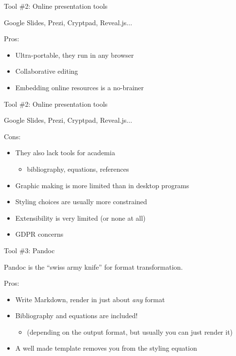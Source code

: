 \documentclass[aspectratio=169]{fireshonks}
\begin{document}
\begin{frame}{Tool \#2: Online presentation tools}
  \begin{center}
    Google Slides, Prezi, Cryptpad, Reveal.js...
  \end{center}

  Pros:
  \begin{itemize}
    \item Ultra-portable, they run in any browser
    \item Collaborative editing
    \item Embedding online resources is a no-brainer
  \end{itemize}
\end{frame}
\begin{frame}{Tool \#2: Online presentation tools}
  \begin{center}
    Google Slides, Prezi, Cryptpad, Reveal.js...
  \end{center}

  Cons:
  \begin{itemize}
    \item They also lack tools for academia
          \begin{itemize}
            \item bibliography, equations, references
          \end{itemize}
    \item Graphic making is more limited than in desktop programs
    \item Styling choices are usually more constrained
    \item Extensibility is very limited (or none at all)
    \item GDPR concerns
  \end{itemize}
\end{frame}
\begin{frame}{Tool \#3: Pandoc}
  \begin{center}
    Pandoc is the \enquote{swiss army knife} for format transformation.
  \end{center}

  Pros:
  \begin{itemize}
    \item Write Markdown, render in just about \emph{any} format
    \item Bibliography and equations are included!
          \begin{itemize}
            \item (depending on the output format, but usually you can just render it)
          \end{itemize}
    \item A well made template removes you from the styling equation 
  \end{itemize}
\end{frame}
\end{document}
